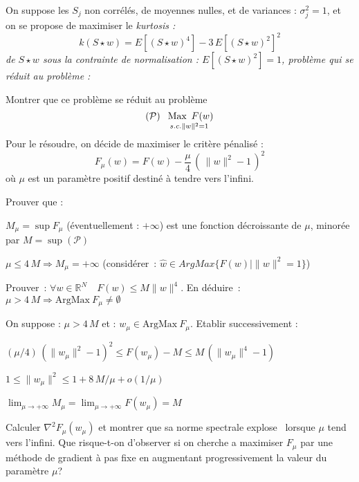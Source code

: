 \documentclass[12pt,a4paper,fleqn]{report}
\newcommand{\R}{\mathbb R}
\newcommand{\hess}{\nabla^2}
\newcommand{\on}{\begin{displaymath}}
\newcommand{\off}{\end{displaymath}}
\renewcommand{\P}{\mathcal P}
\newcommand{\push}[1]{\rule{0pt}{0pt}\hspace{#1pt}}
\begin{document}
\begin{exercice}
On suppose les $S_j$ non corrélés, de moyennes nulles, et de variances :  $\sigma_j^2=1$, et on se propose de maximiser le \it kurtosis \rm :
\on  k(S\star w)= E[(S\star w)^4] -3\,E[(S\star w)^2] ^2 \off
de $S\star w$  sous la contrainte de normalisation : \mbox{$E[(S\star w)^2]=1$}, problème qui se réduit  au problème :
  \begin{questions}
  \item Montrer que ce problème se réduit au problème
    \on ( \P)  \push{5} \underset{ s. c. \|w\|^2=1}{\push
      3\mbox{Max}\push 5 F(w)}  \off
     Pour le résoudre, on décide de maximiser le critère  pénalisé :
 \on F_{\mu}(w)=F(w)-\frac{\mu}{4}\,\left(\,\|w\|^2-1\,\right)^2 \off
 où $\mu$ est un paramètre positif destiné à tendre vers l'infini.
\item Prouver que :
\begin{subquestions}
\item$M_{\mu}= \sup F_{\mu}$ (éventuellement : $+\infty$) est une fonction décroissante de $\mu$, minorée par $M=\sup (\P)$
\item $\mu\leq 4\,M \Rightarrow M_{\mu}=+\infty$ (considérer~: $\hat w\in ArgMax \{F(w)   |   \|w\|^2=1   \}$)
\item Prouver~: $\forall w\in\R^N \quad F(w)\leq M \|w\|^4$. En déduire~: $\mu> 4\,M \Rightarrow \mathrm{ArgMax}\ F_{\mu} \neq \emptyset$
\end{subquestions}
\item On suppose : $\mu> 4\,M$ et : $w_{\mu}\in\mathrm{ArgMax}\ F_{\mu}$. Etablir successivement :
\begin{subquestions}
\item $ (\mu/4)\,(\|w_{\mu}\|^2-1)^2 \leq F(w_{\mu})-M\leq M\,(\|w_{\mu}\|^4-1)$
\item $1\leq \|w_{\mu}\|^2\leq 1+8\,M/\mu +o(1/\mu)$
\item $\lim_{\mu\rightarrow +\infty} M_{\mu}=\lim_{\mu\rightarrow +\infty} F(w_{\mu})= M$
\end{subquestions}
\item Calculer $\hess F_{\mu}(w_{\mu})$ et montrer que sa norme spectrale  \og explose \fg\  lorsque $\mu$ tend vers l'infini.
Que risque-t-on d'observer si on cherche a maximiser $F_{\mu}$ par une méthode de gradient à pas fixe en augmentant progressivement la valeur du paramètre $\mu$?
\end{questions}
\end{exercice}
\end{document}

